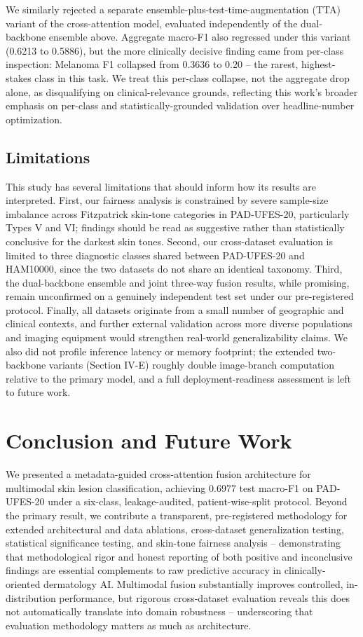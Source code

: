 \documentclass[conference]{IEEEtran}
\begin{document}
We similarly rejected a separate ensemble-plus-test-time-augmentation (TTA) variant of the cross-attention model, evaluated independently of the dual-backbone ensemble above. Aggregate macro-F1 also regressed under this variant (0.6213 to 0.5886), but the more clinically decisive finding came from per-class inspection: Melanoma F1 collapsed from 0.3636 to 0.20 -- the rarest, highest-stakes class in this task. We treat this per-class collapse, not the aggregate drop alone, as disqualifying on clinical-relevance grounds, reflecting this work's broader emphasis on per-class and statistically-grounded validation over headline-number optimization.

\subsection{Limitations}
This study has several limitations that should inform how its results are interpreted. First, our fairness analysis is constrained by severe sample-size imbalance across Fitzpatrick skin-tone categories in PAD-UFES-20, particularly Types V and VI; findings should be read as suggestive rather than statistically conclusive for the darkest skin tones. Second, our cross-dataset evaluation is limited to three diagnostic classes shared between PAD-UFES-20 and HAM10000, since the two datasets do not share an identical taxonomy. Third, the dual-backbone ensemble and joint three-way fusion results, while promising, remain unconfirmed on a genuinely independent test set under our pre-registered protocol. Finally, all datasets originate from a small number of geographic and clinical contexts, and further external validation across more diverse populations and imaging equipment would strengthen real-world generalizability claims. We also did not profile inference latency or memory footprint; the extended two-backbone variants (Section IV-E) roughly double image-branch computation relative to the primary model, and a full deployment-readiness assessment is left to future work.

\section{Conclusion and Future Work}
We presented a metadata-guided cross-attention fusion architecture for multimodal skin lesion classification, achieving 0.6977 test macro-F1 on PAD-UFES-20 under a six-class, leakage-audited, patient-wise-split protocol. Beyond the primary result, we contribute a transparent, pre-registered methodology for extended architectural and data ablations, cross-dataset generalization testing, statistical significance testing, and skin-tone fairness analysis -- demonstrating that methodological rigor and honest reporting of both positive and inconclusive findings are essential complements to raw predictive accuracy in clinically-oriented dermatology AI. Multimodal fusion substantially improves controlled, in-distribution performance, but rigorous cross-dataset evaluation reveals this does not automatically translate into domain robustness -- underscoring that evaluation methodology matters as much as architecture.
\end{document}
